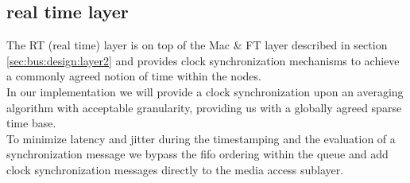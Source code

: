 \subsection{real time layer}
\label{sec:bus:design:layer3}
\label{sec:bus:design:layer6}

The RT (real time) layer is on top of the Mac \& FT layer described in section \ref{sec:bus:design:layer2} and provides clock synchronization mechanisms to achieve a commonly agreed notion of time within the nodes.\\

In our implementation we will provide a clock synchronization upon an averaging algorithm with acceptable granularity, providing us with a globally agreed sparse time base.\\

To minimize latency and jitter during the timestamping and the evaluation of a synchronization message we bypass the fifo ordering within the queue and add clock synchronization messages directly to the media access sublayer.\\